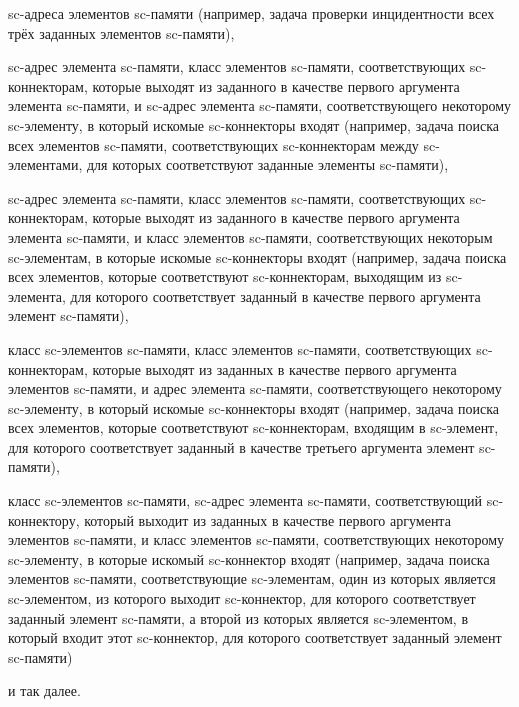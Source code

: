 \begin{textitemize}
	\item sc-адреса элементов sc-памяти (например, задача проверки инцидентности всех трёх заданных элементов sc-памяти),
	\item sc-адрес элемента sc-памяти, класс элементов sc-памяти, соответствующих sc-коннекторам, которые выходят из заданного в качестве первого аргумента элемента sc-памяти, и sc-адрес элемента sc-памяти, соответствующего некоторому sc-элементу, в который искомые sc-коннекторы входят (например, задача поиска всех элементов sc-памяти, соответствующих sc-коннекторам между sc-элементами, для которых соответствуют заданные элементы sc-памяти),
	\item sc-адрес элемента sc-памяти, класс элементов sc-памяти, соответствующих sc-коннекторам, которые выходят из заданного в качестве первого аргумента элемента sc-памяти, и класс элементов sc-памяти, соответствующих некоторым sc-элементам, в которые искомые sc-коннекторы входят (например, задача поиска всех элементов, которые соответствуют sc-коннекторам, выходящим из sc-элемента, для которого соответствует заданный в качестве первого аргумента элемент sc-памяти),
	\item класс sc-элементов sc-памяти, класс элементов sc-памяти, соответствующих sc-коннекторам, которые выходят из заданных в качестве первого аргумента элементов sc-памяти, и адрес элемента sc-памяти, соответствующего некоторому sc-элементу, в который искомые sc-коннекторы входят (например, задача поиска всех элементов, которые соответствуют sc-коннекторам, входящим в sc-элемент, для которого соответствует заданный в качестве третьего аргумента элемент sc-памяти),
	\item класс sc-элементов sc-памяти, sc-адрес элемента sc-памяти, соответствующий sc-коннектору, который выходит из заданных в качестве первого аргумента элементов sc-памяти, и класс элементов sc-памяти, соответствующих некоторому sc-элементу, в которые искомый sc-коннектор входят (например, задача поиска элементов sc-памяти, соответствующие sc-элементам, один из которых является sc-элементом, из которого выходит sc-коннектор, для которого соответствует заданный элемент sc-памяти, а второй из которых является sc-элементом, в который входит этот sc-коннектор, для которого соответствует заданный элемент sc-памяти)
	\item и так далее.
\end{textitemize}
			
